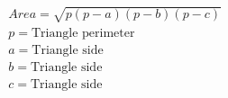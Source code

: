 \begin{align*}
& Area = \sqrt{p (p - a) (p - b) (p - c)} \\
& p = \text{Triangle perimeter} \\
& a = \text{Triangle side} \\
& b = \text{Triangle side} \\
& c = \text{Triangle side} \\
\end{align*}